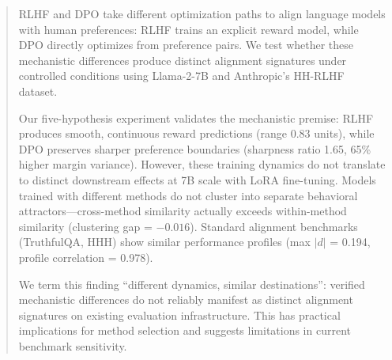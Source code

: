 \begin{abstract}
RLHF and DPO take different optimization paths to align language models with human preferences: RLHF trains an explicit reward model, while DPO directly optimizes from preference pairs. We test whether these mechanistic differences produce distinct alignment signatures under controlled conditions using Llama-2-7B and Anthropic's HH-RLHF dataset.

Our five-hypothesis experiment validates the mechanistic premise: RLHF produces smooth, continuous reward predictions (range 0.83 units), while DPO preserves sharper preference boundaries (sharpness ratio 1.65, 65\% higher margin variance). However, these training dynamics do not translate to distinct downstream effects at 7B scale with LoRA fine-tuning. Models trained with different methods do not cluster into separate behavioral attractors---cross-method similarity actually exceeds within-method similarity (clustering gap = $-0.016$). Standard alignment benchmarks (TruthfulQA, HHH) show similar performance profiles (max $|d|$ = 0.194, profile correlation = 0.978).

We term this finding ``different dynamics, similar destinations'': verified mechanistic differences do not reliably manifest as distinct alignment signatures on existing evaluation infrastructure. This has practical implications for method selection and suggests limitations in current benchmark sensitivity.
\end{abstract}
